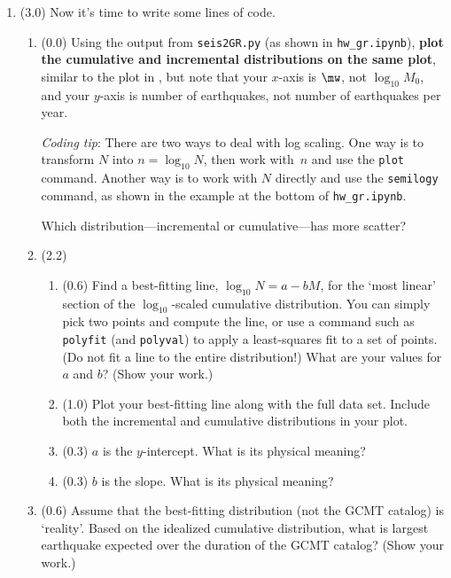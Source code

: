 \documentclass[11pt,titlepage,fleqn]{article}
\begin{document}
\begin{enumerate}

\item (3.0) Now it's time to write some lines of code. 

\begin{enumerate}
\item (0.0) Using the output from \verb+seis2GR.py+ (as shown in \verb+hw_gr.ipynb+), {\bf plot the cumulative and incremental distributions on the same plot}, similar to the plot in \citet[][Figure~4.7-2]{SteinWysession}, but note that your $x$-axis is $\mw$, not $\log_{10} M_0$, and your $y$-axis is number of earthquakes, not number of earthquakes per year.

{\em Coding tip}: There are two ways to deal with log scaling. One way is to transform $N$ into $n = \log_{10} N$, then work with~$n$ and use the \verb+plot+ command. Another way is to work with $N$ directly and use the \verb+semilogy+ command, as shown in the example at the bottom of \verb+hw_gr.ipynb+.

Which distribution---incremental or cumulative---has more scatter?

\pagebreak

\item (2.2)
\begin{enumerate}
\item (0.6) Find a best-fitting line, $\log_{10} N = a - b M$, for the `most linear' section of the $\log_{10}$-scaled cumulative distribution. You can simply pick two points and compute the line, or use a command such as \verb+polyfit+ (and \verb+polyval+) to apply a least-squares fit to a set of points. (Do not fit a line to the entire distribution!) What are your values for $a$ and $b$? (Show your work.)

\item (1.0) Plot your best-fitting line along with the full data set.
Include both the incremental and cumulative distributions in your plot.

\item (0.3) $a$ is the $y$-intercept. What is its physical meaning?

\item (0.3) $b$ is the slope. What is its physical meaning?

\end{enumerate}


\item (0.6) Assume that the best-fitting distribution (not the GCMT catalog) is `reality'. Based on the idealized cumulative distribution, what is largest earthquake expected over the duration of the GCMT catalog? (Show your work.)


\end{enumerate}
\end{enumerate}
\end{document}
